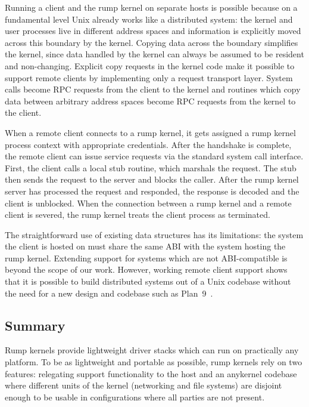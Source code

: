 Running a client and the rump kernel on separate hosts is possible
because on a fundamental level Unix already works like a
distributed system: the kernel and user processes live in different
address spaces and information is explicitly moved across this boundary
by the kernel.  Copying data across the boundary simplifies the kernel,
since data handled by the kernel can always be assumed to be resident and
non-changing.  Explicit copy requests in the kernel code make it possible
to support remote clients by implementing only a request transport layer.
System calls become RPC requests from the client to the kernel
and routines which copy data between arbitrary address spaces become
RPC requests from the kernel to the client.

When a remote client connects to a rump kernel, it gets assigned a rump
kernel process context with appropriate credentials.  After the handshake
is complete, the remote client can issue service requests via the standard
system call interface.  First, the client calls a local stub routine,
which marshals the request.  The stub then sends the request to the
server and blocks the caller.  After the rump kernel server has processed
the request and responded, the response is decoded and the client is
unblocked.  When the connection between a rump kernel and a remote client
is severed, the rump kernel treats the client process as terminated.

The straightforward use of existing data structures has its limitations:
the system the client is hosted on must share the same ABI with the
system hosting the rump kernel.  Extending support for systems which are
not ABI-compatible is beyond the scope of our work.  However, working
remote client support shows that it is possible to build distributed
systems out of a Unix codebase without the need for a new design and
codebase such as Plan~9~\cite{pike:plan9}.

\subsection{Summary}

Rump kernels provide lightweight driver stacks which can run on
practically any platform.  To be as lightweight and portable as possible, rump
kernels rely on two features: relegating support functionality to the
host and an anykernel codebase where different units of
the kernel (\eg networking and file systems) are disjoint enough to be
usable in configurations where all parties are not present.


